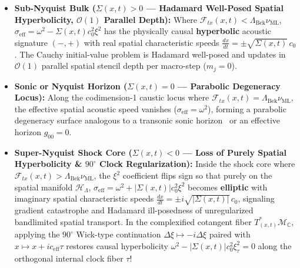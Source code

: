 \documentclass[11pt,a4paper]{article}
\theoremstyle{definition}
\begin{document}
\begin{itemize}
\item \textbf{Sub-Nyquist Bulk ($\Sigma(x, t) > 0$ --- Hadamard Well-Posed Spatial Hyperbolicity, $\mathcal{O}(1)$ Parallel Depth):} Where $\mathcal{F}_{tx}(x,t) < \Lambda_{\text{Bek}} \nu_{\text{ML}}$, $\sigma_{\text{eff}} = \omega^2 - \Sigma(x,t) c_0^2 \xi^2$ has the physically causal \textbf{hyperbolic} acoustic signature $(-,+)$ with real spatial characteristic speeds $\frac{dx}{dt} = \pm \sqrt{\Sigma(x,t)}\, c_0$. The Cauchy initial-value problem is Hadamard well-posed and updates in $\mathcal{O}(1)$ parallel spatial stencil depth per macro-step ($m_j = 0$).
\item \textbf{Sonic or Nyquist Horizon ($\Sigma(x, t) = 0$ --- Parabolic Degeneracy Locus):} Along the codimension-1 caustic locus where $\mathcal{F}_{tx}(x,t) = \Lambda_{\text{Bek}} \nu_{\text{ML}}$, the effective spatial acoustic speed vanishes ($\sigma_{\text{eff}} = \omega^2$), forming a parabolic degeneracy surface analogous to a transonic sonic horizon~\cite{tricomi1923,keldysh1951} or an effective horizon $g_{00} = 0$.
\item \textbf{Super-Nyquist Shock Core ($\Sigma(x, t) < 0$ --- Loss of Purely Spatial Hyperbolicity \& $90^\circ$ Clock Regularization):} Inside the shock core where $\mathcal{F}_{tx}(x,t) > \Lambda_{\text{Bek}} \nu_{\text{ML}}$, the $\xi^2$ coefficient flips sign so that purely on the spatial manifold $\mathcal{H}_{\Lambda}$, $\sigma_{\text{eff}} = \omega^2 + |\Sigma(x,t)| c_0^2 \xi^2$ becomes \textbf{elliptic} with imaginary spatial characteristic speeds $\frac{dx}{dt} = \pm i \sqrt{|\Sigma(x,t)|}\, c_0$, signaling gradient catastrophe and Hadamard ill-posedness of unregularized bandlimited spatial transport. In the complexified cotangent fiber $T^*_{(x,t)}\mathcal{M}_{\mathbb{C}}$, applying the $90^\circ$ Wick-type continuation $\Delta\xi \mapsto -i\Delta\xi$ paired with $x \mapsto x + i c_{\text{eff}}\tau$ restores causal hyperbolicity $\omega^2 - |\Sigma(x,t)| c_0^2 \xi_{\tau}^2 = 0$ along the orthogonal internal clock fiber $\tau$!
\end{itemize}
\end{document}
